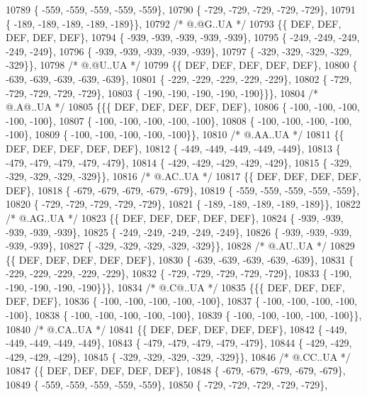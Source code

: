 \begin{DoxyCode}
10789 \{ -559, -559, -559, -559, -559\},
10790 \{ -729, -729, -729, -729, -729\},
10791 \{ -189, -189, -189, -189, -189\}\},
10792 \textcolor{comment}{/*  @.@G..UA */}
10793 \{\{  DEF,  DEF,  DEF,  DEF,  DEF\},
10794 \{ -939, -939, -939, -939, -939\},
10795 \{ -249, -249, -249, -249, -249\},
10796 \{ -939, -939, -939, -939, -939\},
10797 \{ -329, -329, -329, -329, -329\}\},
10798 \textcolor{comment}{/*  @.@U..UA */}
10799 \{\{  DEF,  DEF,  DEF,  DEF,  DEF\},
10800 \{ -639, -639, -639, -639, -639\},
10801 \{ -229, -229, -229, -229, -229\},
10802 \{ -729, -729, -729, -729, -729\},
10803 \{ -190, -190, -190, -190, -190\}\}\},
10804 \textcolor{comment}{/*  @.A@..UA */}
10805 \{\{\{  DEF,  DEF,  DEF,  DEF,  DEF\},
10806 \{ -100, -100, -100, -100, -100\},
10807 \{ -100, -100, -100, -100, -100\},
10808 \{ -100, -100, -100, -100, -100\},
10809 \{ -100, -100, -100, -100, -100\}\},
10810 \textcolor{comment}{/*  @.AA..UA */}
10811 \{\{  DEF,  DEF,  DEF,  DEF,  DEF\},
10812 \{ -449, -449, -449, -449, -449\},
10813 \{ -479, -479, -479, -479, -479\},
10814 \{ -429, -429, -429, -429, -429\},
10815 \{ -329, -329, -329, -329, -329\}\},
10816 \textcolor{comment}{/*  @.AC..UA */}
10817 \{\{  DEF,  DEF,  DEF,  DEF,  DEF\},
10818 \{ -679, -679, -679, -679, -679\},
10819 \{ -559, -559, -559, -559, -559\},
10820 \{ -729, -729, -729, -729, -729\},
10821 \{ -189, -189, -189, -189, -189\}\},
10822 \textcolor{comment}{/*  @.AG..UA */}
10823 \{\{  DEF,  DEF,  DEF,  DEF,  DEF\},
10824 \{ -939, -939, -939, -939, -939\},
10825 \{ -249, -249, -249, -249, -249\},
10826 \{ -939, -939, -939, -939, -939\},
10827 \{ -329, -329, -329, -329, -329\}\},
10828 \textcolor{comment}{/*  @.AU..UA */}
10829 \{\{  DEF,  DEF,  DEF,  DEF,  DEF\},
10830 \{ -639, -639, -639, -639, -639\},
10831 \{ -229, -229, -229, -229, -229\},
10832 \{ -729, -729, -729, -729, -729\},
10833 \{ -190, -190, -190, -190, -190\}\}\},
10834 \textcolor{comment}{/*  @.C@..UA */}
10835 \{\{\{  DEF,  DEF,  DEF,  DEF,  DEF\},
10836 \{ -100, -100, -100, -100, -100\},
10837 \{ -100, -100, -100, -100, -100\},
10838 \{ -100, -100, -100, -100, -100\},
10839 \{ -100, -100, -100, -100, -100\}\},
10840 \textcolor{comment}{/*  @.CA..UA */}
10841 \{\{  DEF,  DEF,  DEF,  DEF,  DEF\},
10842 \{ -449, -449, -449, -449, -449\},
10843 \{ -479, -479, -479, -479, -479\},
10844 \{ -429, -429, -429, -429, -429\},
10845 \{ -329, -329, -329, -329, -329\}\},
10846 \textcolor{comment}{/*  @.CC..UA */}
10847 \{\{  DEF,  DEF,  DEF,  DEF,  DEF\},
10848 \{ -679, -679, -679, -679, -679\},
10849 \{ -559, -559, -559, -559, -559\},
10850 \{ -729, -729, -729, -729, -729\},

\end{DoxyCode}
